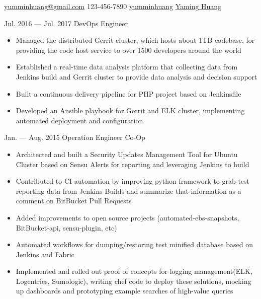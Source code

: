 \documentclass{newresume}
\begin{document}
{\href{mailto:yumminhuang@gmail.com}{yumminhuang@gmail.com}}
{123-456-7890}
{\href{https://github.com/yumminhuang}{yumminhuang}}
{\href{https://www.linkedin.com/in/yaming-huang-6a09325b}{Yaming Huang}}
{}


\begin{body}
	{Jul. 2016 --- Jul. 2017}
	{DevOps Engineer}
	{}
	\begin{itemize}[noitemsep,topsep=0pt]
		\item Managed the distributed Gerrit cluster, which hosts about 1TB codebase, for providing the code host service to over 1500 developers around the world
		\item Established a real-time data analysis platform that collecting data from Jenkins build and Gerrit cluster to provide data analysis and decision support
		\item Built a continuous delivery pipeline for PHP project based on Jenkinsfile
		\item Developed an Ansible playbook for Gerrit  and ELK cluster, implementing automated deployment and configuration
	\end{itemize}
\end{body}

\begin{body}
	{Jan. --- Aug. 2015}
	{Operation Engineer Co-Op}
	{}
	\begin{itemize}[noitemsep,topsep=0pt]
		\item Architected and built a Security Updates Management Tool for Ubuntu Cluster based on Sensu Alerts for reporting and leveraging Jenkins to build
		\item Contributed to CI automation by improving python framework to grab test reporting data from Jenkins Builds and summarize that information as a comment on BitBucket Pull Requests
		\item Added improvements to open source projects (automated-ebs-snapshots, BitBucket-api, sensu-plugin, etc)
		\item Automated workflows for dumping/restoring test minified database based on Jenkins and Fabric
		\item Implemented and rolled out proof of concepts for logging management(ELK, Logentries, Sumologic), writing chef code to deploy these solutions, mocking up dashboards and prototyping example searches of high-value queries
	\end{itemize}
\end{body}
\end{document}
